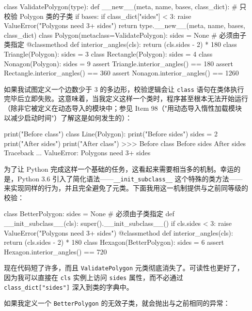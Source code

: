 \begin{codebox}[python]
class ValidatePolygon(type):
    def __new__(meta, name, bases, class_dict):
        # 只校验 Polygon 类的子类
        if bases:
            if class_dict["sides"] < 3:
                raise ValueError("Polygons need 3+ sides")
        return type.__new__(meta, name, bases, class_dict)
class Polygon(metaclass=ValidatePolygon):
    sides = None  # 必须由子类指定
    @classmethod
    def interior_angles(cls):
        return (cls.sides - 2) * 180
class Triangle(Polygon):
    sides = 3
class Rectangle(Polygon):
    sides = 4
class Nonagon(Polygon):
    sides = 9
assert Triangle.interior_angles() == 180
assert Rectangle.interior_angles() == 360
assert Nonagon.interior_angles() == 1260
\end{codebox}

如果我试图定义一个边数少于 3 的多边形，校验逻辑会让 \texttt{class} 语句在类体执行完毕后立即失败。这意味着，当我定义这样一个类时，程序甚至根本无法开始运行（除非它被定义在动态导入的模块中；参见 Item 98（"用动态导入惰性加载模块以减少启动时间"）了解这是如何发生的）：

\begin{codebox}[python]
print("Before class")
class Line(Polygon):
    print("Before sides")
    sides = 2
    print("After sides")
print("After class")
>>>
Before class
Before sides
After sides
Traceback ...
ValueError: Polygons need 3+ sides
\end{codebox}

为了让 Python 完成这样一个基础的任务，这看起来需要相当多的机制。幸运的是，Python 3.6 引入了简化语法——\texttt{\_\_init\_subclass\_\_} 这个特殊的类方法——来实现同样的行为，并且完全避免了元类。下面我用这一机制提供与之前同等级的校验：

\begin{codebox}[python]
class BetterPolygon:
    sides = None  # 必须由子类指定
    def __init_subclass__(cls):
        super().__init_subclass__()
        if cls.sides < 3:
            raise ValueError("Polygons need 3+ sides")
    @classmethod
    def interior_angles(cls):
        return (cls.sides - 2) * 180
class Hexagon(BetterPolygon):
    sides = 6
assert Hexagon.interior_angles() == 720
\end{codebox}

现在代码短了许多，而且 \texttt{ValidatePolygon} 元类彻底消失了。可读性也更好了，因为我可以直接在 \texttt{cls} 实例上访问 \texttt{sides} 属性，而不必通过 \texttt{class\_dict["sides"]} 深入到类的字典中。

如果我定义一个 \texttt{BetterPolygon} 的无效子类，就会抛出与之前相同的异常：


